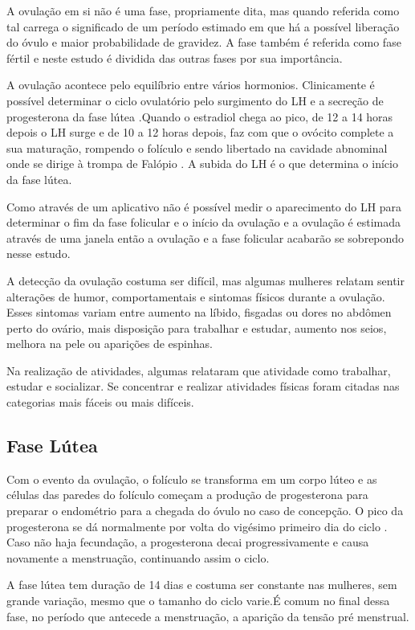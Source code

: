 A ovulação em si não é uma fase, propriamente dita, mas quando referida como tal carrega o significado de um período estimado em que há a possível liberação do óvulo e maior probabilidade de gravidez. A fase também é referida como fase fértil e neste estudo é dividida das outras fases por sua importância.

A ovulação acontece pelo equilíbrio entre vários hormonios. Clinicamente é possível determinar o ciclo ovulatório pelo surgimento do LH e a secreção de progesterona da fase lútea \cite{fritz2010}.Quando o estradiol chega ao pico, de 12 a 14 horas depois o LH surge e de 10 a 12 horas depois, faz com que o ovócito complete a sua maturação, rompendo o folículo e sendo libertado na cavidade abnominal onde se dirige à trompa de Falópio \cite{fritz2010}. A subida do LH é o que determina o início da fase lútea.

Como através de um aplicativo não é possível medir o aparecimento do LH para determinar o fim da fase folicular e o início da ovulação e a ovulação é estimada através de uma janela então a ovulação e a fase folicular acabarão se sobrepondo nesse estudo.

A detecção da ovulação costuma ser difícil, mas algumas mulheres relatam sentir alterações de humor, comportamentais e sintomas físicos durante a ovulação. Esses sintomas variam entre aumento na líbido, fisgadas ou dores no abdômen perto do ovário, mais disposição para trabalhar e estudar, aumento nos seios, melhora na pele ou aparições de espinhas.

Na realização de atividades, algumas relataram que atividade como trabalhar, estudar e socializar. Se concentrar e realizar atividades físicas foram citadas nas categorias mais fáceis ou mais difíceis.

\subsection{Fase Lútea}

Com o evento da ovulação, o folículo se transforma em um corpo lúteo e as células das paredes do folículo começam a produção de progesterona para preparar o endométrio para a chegada do óvulo no caso de concepção. O pico da progesterona se dá normalmente por volta do vigésimo primeiro dia do ciclo \cite{nikas2003}. Caso não haja fecundação, a progesterona decai progressivamente e causa novamente a menstruação, continuando assim o ciclo.

A fase lútea tem duração de 14 dias e costuma ser constante nas mulheres, sem grande variação, mesmo que o tamanho do ciclo varie.É comum no final dessa fase, no período que antecede a menstruação, a aparição da tensão pré menstrual.

